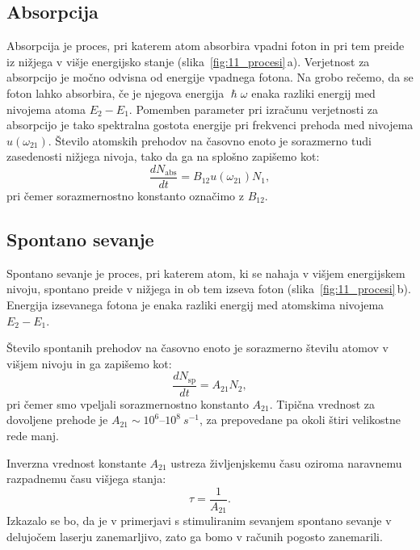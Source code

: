 \subsection*{Absorpcija}
Absorpcija je proces, pri katerem atom absorbira vpadni foton in pri tem 
preide iz nižjega v višje energijsko stanje (slika~\ref{fig:11_procesi}\,a). 
Verjetnost za absorpcijo je močno odvisna od energije vpadnega fotona. Na grobo 
rečemo, da se foton lahko absorbira, če je njegova energija $\hslash \omega$ 
enaka razliki energij med nivojema atoma $E_2-E_1$. Pomemben parameter pri izračunu 
verjetnosti za absorpcijo je tako spektralna gostota energije 
pri frekvenci prehoda med nivojema $u(\omega_{21})$. 
Število atomskih prehodov na časovno enoto je sorazmerno tudi zasedenosti
nižjega nivoja, tako da ga na splošno zapišemo kot:
\begin{equation}
\frac{dN_\mathrm{abs}}{dt} = B_{12}u(\omega_{21}) N_1,
\label{eq:11_08}
\end{equation}
pri čemer sorazmernostno konstanto označimo z $B_{12}$. 

\subsection*{Spontano sevanje}
Spontano sevanje je proces, pri katerem atom, 
ki se nahaja v višjem energijskem nivoju, spontano preide v nižjega
in ob tem izseva foton (slika~\ref{fig:11_procesi}\,b). Energija
izsevanega fotona je enaka razliki energij med atomskima nivojema $E_2-E_1$.

Število spontanih prehodov na časovno enoto je sorazmerno številu
atomov v višjem nivoju in ga zapišemo kot:
\begin{equation}
\frac{dN_\mathrm{sp}}{dt} = A_{21}N_2,
\label{eq:11_09}
\end{equation}
pri čemer smo vpeljali sorazmernostno konstanto $A_{21}$. Tipična vrednost 
za dovoljene prehode je $A_{21}\sim 10^{6}$--$10^8~\si{s^{-1}}$, za prepovedane pa okoli 
štiri velikostne rede manj. 

Inverzna vrednost konstante $A_{21}$
ustreza življenjskemu času oziroma naravnemu razpadnemu času višjega
stanja:
\begin{equation}
\tau = \frac{1}{A_{21}}.
\label{eq:11_10}
\end{equation}
Izkazalo se bo, da je v primerjavi s stimuliranim sevanjem spontano sevanje v 
delujočem laserju zanemarljivo, zato ga bomo v računih pogosto zanemarili. 

